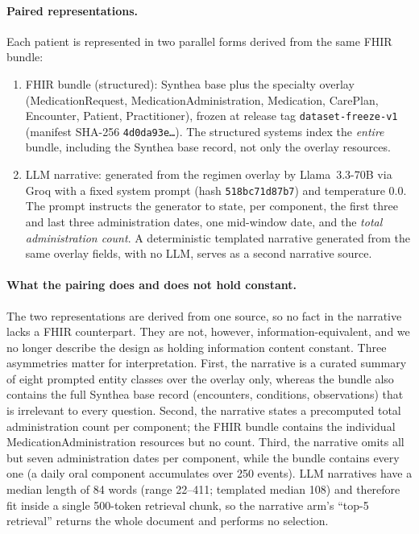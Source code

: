 \paragraph{Paired representations.}
Each patient is represented in two parallel forms derived from the same FHIR bundle:
\begin{enumerate}
  \item FHIR bundle (structured): Synthea base plus the specialty overlay
    (MedicationRequest, MedicationAdministration, Medication, CarePlan, Encounter, Patient,
    Practitioner), frozen at release tag \texttt{dataset-freeze-v1}
    (manifest SHA-256 \texttt{4d0da93e\ldots}).  The structured systems index the
    \emph{entire} bundle, including the Synthea base record, not only the overlay
    resources.
  \item LLM narrative: generated from the regimen overlay by Llama~3.3-70B via Groq with
    a fixed system prompt (hash \texttt{518bc71d87b7}) and temperature 0.0.  The prompt
    instructs the generator to state, per component, the first three and last three
    administration dates, one mid-window date, and the \emph{total administration count}.
    A deterministic templated narrative generated from the same overlay fields, with no
    LLM, serves as a second narrative source.
\end{enumerate}

\paragraph{What the pairing does and does not hold constant.}
The two representations are derived from one source, so no fact in the narrative lacks a
FHIR counterpart.  They are not, however, information-equivalent, and we no longer describe
the design as holding information content constant.  Three asymmetries matter for
interpretation.  First, the narrative is a curated summary of eight prompted entity
classes over the overlay only, whereas the bundle also contains the full Synthea base
record (encounters, conditions, observations) that is irrelevant to every question.
Second, the narrative states a precomputed total administration count per component; the
FHIR bundle contains the individual MedicationAdministration resources but no count.
Third, the narrative omits all but seven administration dates per component, while the
bundle contains every one (a daily oral component accumulates over 250 events).  LLM
narratives have a median length of 84 words (range 22--411; templated median 108) and
therefore fit inside a single 500-token retrieval chunk, so the narrative arm's ``top-5
retrieval'' returns the whole document and performs no selection.

